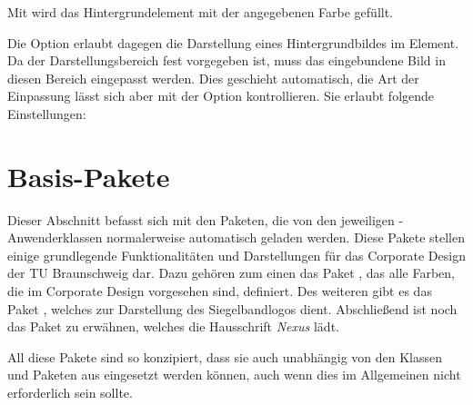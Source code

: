 \documentclass[a4paper,11pt]{tubsreprt}
\newcommand{\CD}{Corporate Design\xspace}
\begin{document}
Mit  wird das Hintergrundelement mit der angegebenen
Farbe gefüllt.

Die Option  erlaubt dagegen die Darstellung
eines Hintergrundbildes im Element.
Da der Darstellungsbereich fest vorgegeben ist, muss das eingebundene Bild
in diesen Bereich eingepasst werden. Dies geschieht automatisch, die Art
der Einpassung lässt sich aber mit der Option  kontrollieren.
Sie erlaubt folgende Einstellungen:


\begin{desctable}
\end{desctable}

\part{Basis-Pakete}

Dieser Abschnitt befasst sich mit den Paketen, die von den jeweiligen
\tubslatex-Anwenderklassen normalerweise automatisch geladen werden.
Diese Pakete stellen einige grundlegende Funktionalitäten und Darstellungen
für das \CD der TU Braunschweig dar. Dazu gehören zum einen das Paket
, das alle Farben, die im \CD vorgesehen sind,
definiert. Des weiteren gibt es das Paket , welches
zur Darstellung des Siegelbandlogos dient. Abschließend ist noch das Paket
 zu erwähnen, welches die Hausschrift \emph{Nexus}
lädt.

All diese Pakete sind so konzipiert, dass sie auch unabhängig von den
Klassen und Paketen aus \tubslatex eingesetzt werden können, auch wenn dies
im Allgemeinen nicht erforderlich sein sollte.







\appendix





\end{document}

